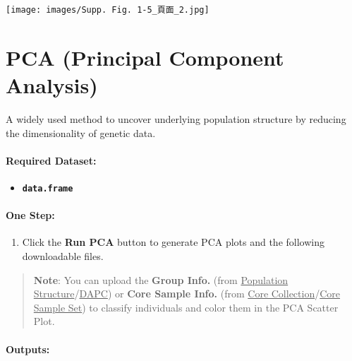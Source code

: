 \documentclass[
]{book}
\providecommand{\tightlist}{%
  \setlength{\itemsep}{0pt}\setlength{\parskip}{0pt}}
\begin{document}
\texttt{[image: images/Supp. Fig. 1-5\_頁面\_2.jpg]}

\section{PCA (Principal Component Analysis)}\label{pca-principal-component-analysis}

A widely used method to uncover underlying population structure by reducing the dimensionality of genetic data.

\paragraph*{Required Dataset:}\label{required-dataset-1}

\begin{itemize}
\tightlist
\item
  {\textbf{\texttt{data.frame}}}
\end{itemize}

\paragraph*{\texorpdfstring{\textbf{One Step:}}{One Step:}}\label{one-step-1}

\begin{enumerate}
\def\labelenumi{\arabic{enumi}.}
\tightlist
\item
  Click the {\textbf{Run PCA}} button to generate PCA plots and the following downloadable files.
\end{enumerate}

\begin{quote}
\textbf{Note}: You can upload the \textbf{Group Info.} (from \ul{Population Structure}/\ul{DAPC}) or \textbf{Core Sample Info.} (from \ul{Core Collection}/\ul{Core Sample Set}) to classify individuals and color them in the PCA Scatter Plot.
\end{quote}

\paragraph*{Outputs:}\label{outputs-5}
\end{document}
